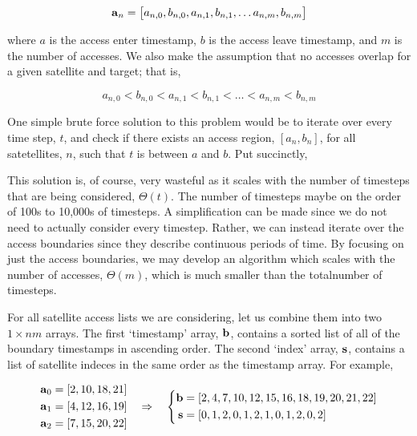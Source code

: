 \begin{equation} 
    \bm{\mathrm{a}}_{n} = \left[ a_{n,0}, b_{n,0}, a_{n,1}, b_{n,1}, \ldots a_{n,m}, b_{n,m} \right]
\end{equation}


where $a$ is the access enter timestamp, $b$ is the access leave timestamp, and
$m$ is the number of accesses. We also make the assumption that no accesses
overlap for a given satellite and target; that is,

\[
    a_{n,0} < b_{n,0} < a_{n,1} < b_{n,1} < \ldots < a_{n,m} < b_{n,m}
\]

One simple brute force solution to this problem would be to iterate over every
time step, $t$, and check if there exists an access region, $[a_n,b_n]$, for all
satetellites, $n$, such that $t$ is between $a$ and $b$. Put succinctly,


This solution is, of course, very wasteful as it scales with the number of
timesteps that are being considered, $\Theta(t)$. The number of timesteps maybe
on the order of 100s to 10,000s of timesteps. A simplification can be made
since we do not need to actually consider every timestep. Rather, we can
instead iterate over the access boundaries since they describe continuous
periods of time. By focusing on just the access boundaries, we may develop an
algorithm which scales with the number of accesses, $\Theta(m)$, which is much
smaller than the totalnumber of timesteps.

For all satellite access lists we are considering, let us combine them into two
$1\times nm$ arrays. The first `timestamp' array, $\bm{\mathrm{b}}$, contains a sorted
list of all of the boundary timestamps in ascending order. The second `index'
array, $\bm{\mathrm{s}}$, contains a list of satellite indeces in the same order as the
timestamp array. For example,

\begin{equation*}
    \begin{aligned} 
	\bm{\mathrm{a}}_{0} &= \left[ 2, 10, 18, 21  \right] \\
	\bm{\mathrm{a}}_{1} &= \left[ 4, 12, 16, 19  \right] \\
	\bm{\mathrm{a}}_{2} &= \left[ 7, 15, 20, 22  \right] \\
    \end{aligned}
    \quad \Rightarrow \quad
    \left \{ 
	\begin{aligned}
	    \bm{\mathrm{b}} &= [ 2 , 4 , 7 , 10 , 12 , 15 , 16 , 18 , 19 , 20 , 21 , 22  ] \\
	    \bm{\mathrm{s}} &= [ 0 , 1 , 2 , 0 , 1 , 2 , 1 , 0 , 1 , 2 , 0 , 2  ]
	\end{aligned}
    \right.
\end{equation*}

